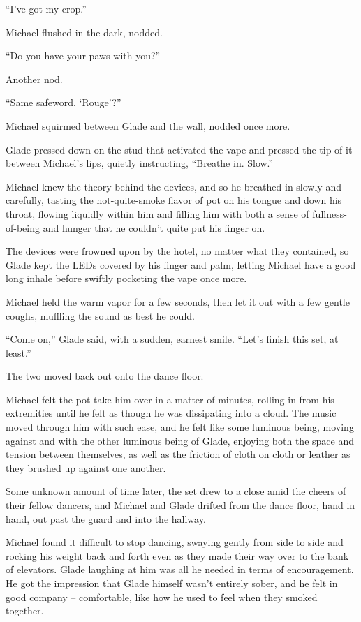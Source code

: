 ``I've got my crop.''

Michael flushed in the dark, nodded.

``Do you have your paws with you?''

Another nod.

``Same safeword. `Rouge'?''

Michael squirmed between Glade and the wall, nodded once more.

Glade pressed down on the stud that activated the vape and pressed the tip of it between Michael's lips, quietly instructing, ``Breathe in. Slow.''

Michael knew the theory behind the devices, and so he breathed in slowly and carefully, tasting the not-quite-smoke flavor of pot on his tongue and down his throat, flowing liquidly within him and filling him with both a sense of fullness-of-being and hunger that he couldn't quite put his finger on.

The devices were frowned upon by the hotel, no matter what they contained, so Glade kept the LEDs covered by his finger and palm, letting Michael have a good long inhale before swiftly pocketing the vape once more.

Michael held the warm vapor for a few seconds, then let it out with a few gentle coughs, muffling the sound as best he could.

``Come on,'' Glade said, with a sudden, earnest smile. ``Let's finish this set, at least.''

The two moved back out onto the dance floor.

Michael felt the pot take him over in a matter of minutes, rolling in from his extremities until he felt as though he was dissipating into a cloud. The music moved through him with such ease, and he felt like some luminous being, moving against and with the other luminous being of Glade, enjoying both the space and tension between themselves, as well as the friction of cloth on cloth or leather as they brushed up against one another.

Some unknown amount of time later, the set drew to a close amid the cheers of their fellow dancers, and Michael and Glade drifted from the dance floor, hand in hand, out past the guard and into the hallway.

Michael found it difficult to stop dancing, swaying gently from side to side and rocking his weight back and forth even as they made their way over to the bank of elevators. Glade laughing at him was all he needed in terms of encouragement. He got the impression that Glade himself wasn't entirely sober, and he felt in good company -- comfortable, like how he used to feel when they smoked together.

